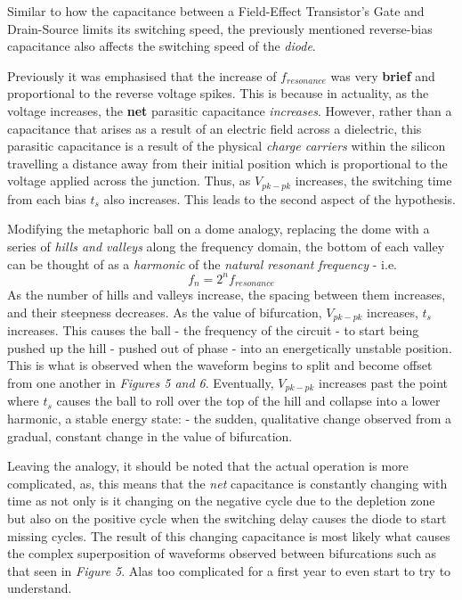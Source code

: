 \documentclass[10pt,twocolumn,letterpaper]{article}
\begin{document}
Similar to how the capacitance between a Field-Effect Transistor's Gate and Drain-Source limits its switching speed, the previously mentioned reverse-bias capacitance also affects the switching speed of the \textit{diode}.  

Previously it was emphasised that the increase of \(f_{resonance}\) was very \textbf{brief} and proportional to the reverse voltage spikes.  This is because in actuality, as the voltage increases, the \textbf{net} parasitic capacitance \textit{increases}. However, rather than a capacitance that arises as a result of an electric field across a dielectric, this parasitic capacitance is a result of the physical \textit{charge carriers} within the silicon travelling a distance away from their initial position which is proportional to the voltage applied across the junction.  Thus, as \(V_{pk-pk}\) increases, the switching time from each bias \(t_s\) also increases\cite{switching}.  This leads to the second aspect of the hypothesis.  

Modifying the metaphoric ball on a dome analogy, replacing the dome with a series of \textit{hills and valleys} along the frequency domain, the bottom of each valley can be thought of as a \textit{harmonic} of the \textit{natural resonant frequency} - i.e. 
\[f_{n} = {2^{n}}{f_{resonance}}\]
As the number of hills and valleys increase, the spacing between them increases, and their steepness decreases.  
As the value of bifurcation, \(V_{pk-pk}\) increases, \(t_s\) increases.  This causes the ball - the frequency of the circuit - to start being pushed up the hill - pushed out of phase - into an energetically unstable position. This is what is observed when the waveform begins to split and become offset from one another in \textit{Figures 5 and 6}.  Eventually, \(V_{pk-pk}\) increases past the point where \(t_s\) causes the ball to roll over the top of the hill and collapse into a lower harmonic, a stable energy state: - the sudden, qualitative change observed from a gradual, constant change in the value of bifurcation.

Leaving the analogy, it should be noted that the actual operation is more complicated, as, this means that the \textit{net} capacitance is constantly changing with time as not only is it changing on the negative cycle due to the depletion zone but also on the positive cycle when the switching delay causes the diode to start missing cycles.  The result of this changing capacitance is most likely what causes the complex superposition of waveforms observed between bifurcations such as that seen in \textit{Figure 5}.  Alas too complicated for a first year to even start to try to understand.
\end{document}

